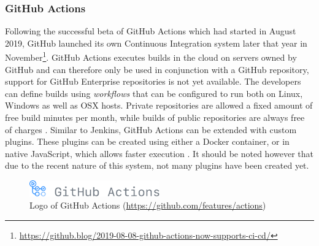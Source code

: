
\subsubsection{GitHub Actions}
Following the successful beta of GitHub Actions which had started in August 2019, GitHub launched its own Continuous Integration system later that year in November\footnote{\url{https://github.blog/2019-08-08-github-actions-now-supports-ci-cd/}}. GitHub Actions executes builds in the cloud on servers owned by GitHub and can therefore only be used in conjunction with a GitHub repository, support for GitHub Enterprise repositories is not yet available. The developers can define builds using \emph{workflows} that can be configured to run both on Linux, Windows as well as OSX hosts. Private repositories are allowed a fixed amount of free build minutes per month, while builds of public repositories are always free of charges \cite{githubactions}. Similar to Jenkins, GitHub Actions can be extended with custom plugins. These plugins can be created using either a Docker container, or in native JavaScript, which allows faster execution \cite{aboutgithubactions}. It should be noted however that due to the recent nature of this system, not many plugins have been created yet.

\begin{figure}[htbp!]
	\centering
	\includegraphics[width=0.5\textwidth]{assets/github-actions.pdf}
	\caption{Logo of GitHub Actions (\url{https://github.com/features/actions})}
	\label{fig:github-actions}
\end{figure}